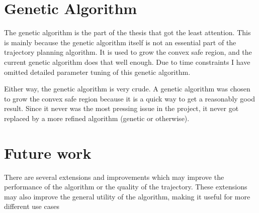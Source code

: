\section{Genetic Algorithm}
The genetic algorithm is the part of the thesis that got the least attention. This is mainly because the genetic algorithm itself is not an essential part of the trajectory planning algorithm. It is used to grow the convex safe region, and the current genetic algorithm does that well enough. Due to time constraints I have omitted detailed parameter tuning of this genetic algorithm.
\par
Either way, the genetic algorithm is very crude. A genetic algorithm was chosen to grow the convex safe region because it is a quick way to get a reasonably good result.  Since it never was the most pressing issue in the project, it never got replaced by a more refined algorithm (genetic or otherwise). 

\section{Future work}
\label{section:future}
There are several extensions and improvements which may improve the performance of the algorithm or the quality of the trajectory. These extensions may also improve the general utility of the algorithm, making it useful for more different use cases

